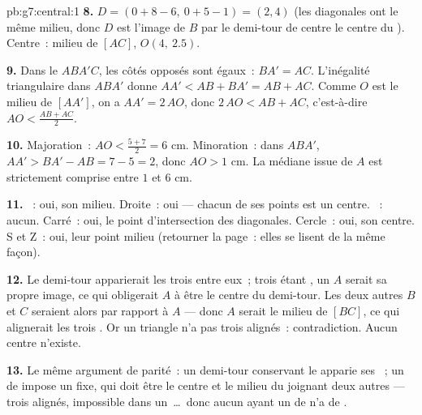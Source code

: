 \begin{solution}{pb:g7:central:1}
\textbf{8.} $D = (0 + 8 - 6,\ 0 + 5 - 1) = (2, 4)$ (les diagonales
ont le même milieu, donc $D$ est l'image de $B$ par le demi-tour de
centre le centre du ). Centre~: milieu de $[AC]$,
$O(4,\ 2.5)$.

\textbf{9.} Dans le  $ABA'C$, les côtés opposés sont
égaux~: $BA' = AC$. L'inégalité triangulaire dans $ABA'$ donne
$AA' < AB + BA' = AB + AC$. Comme $O$ est le milieu de $[AA']$, on a
$AA' = 2\,AO$, donc $2\,AO < AB + AC$, c'est-à-dire
$AO < \frac{AB + AC}{2}$.

\textbf{10.} Majoration~: $AO < \frac{5 + 7}{2} = 6$ cm.
Minoration~: dans $ABA'$, $AA' > BA' - AB = 7 - 5 = 2$, donc
$AO > 1$ cm. La médiane issue de $A$ est strictement comprise entre
$1$ et $6$ cm.

\textbf{11.} ~: oui, son milieu. Droite~: oui --- chacun de
ses points est un centre. ~: aucun. Carré~: oui,
le point d'intersection des diagonales. Cercle~: oui, son centre.
S et Z~: oui, leur point milieu (retourner la page~: elles se lisent
de la même façon).

\textbf{12.} Le demi-tour apparierait les trois  entre eux~;
trois étant , un  $A$ serait sa propre image, ce qui
obligerait $A$ à être le centre du demi-tour. Les deux autres
 $B$ et $C$ seraient alors  par rapport à $A$ ---
donc $A$ serait le milieu de $[BC]$, ce qui alignerait les trois
. Or un triangle n'a pas trois  alignés~:
contradiction. Aucun centre n'existe.

\textbf{13.} Le même argument de parité~: un demi-tour conservant le
 apparie ses ~; un  de  impose un
 fixe, qui doit être le centre et le milieu du  joignant
deux autres  --- trois  alignés, impossible dans un
\,\dots\ donc aucun  ayant un  de
 n'a de .


\end{solution}
